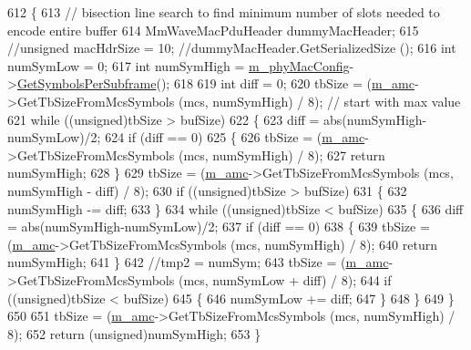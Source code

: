 \begin{DoxyCode}
612 \{
613         \textcolor{comment}{// bisection line search to find minimum number of slots needed to encode entire buffer}
614         MmWaveMacPduHeader dummyMacHeader;
615         \textcolor{comment}{//unsigned macHdrSize = 10; //dummyMacHeader.GetSerializedSize ();}
616         \textcolor{keywordtype}{int} numSymLow = 0;
617         \textcolor{keywordtype}{int} numSymHigh = \hyperlink{classns3_1_1MmWaveMacScheduler_a24d7af4971d2e500fe543cefbafa2fd9}{m\_phyMacConfig}->\hyperlink{classns3_1_1MmWavePhyMacCommon_a2fe835b76e3c689defa413e395cd10cb}{GetSymbolsPerSubframe}();
618 
619         \textcolor{keywordtype}{int} diff = 0;
620         tbSize = (\hyperlink{classns3_1_1MmWaveFlexTtiMacScheduler_a80d0b9fd279dd5c33c52cf0833d264da}{m\_amc}->GetTbSizeFromMcsSymbols (mcs, numSymHigh) / 8); \textcolor{comment}{// start with max value}
621         \textcolor{keywordflow}{while} ((\textcolor{keywordtype}{unsigned})tbSize > bufSize)
622         \{
623                 diff = abs(numSymHigh-numSymLow)/2;
624                 \textcolor{keywordflow}{if} (diff == 0)
625                 \{
626                         tbSize = (\hyperlink{classns3_1_1MmWaveFlexTtiMacScheduler_a80d0b9fd279dd5c33c52cf0833d264da}{m\_amc}->GetTbSizeFromMcsSymbols (mcs, numSymHigh) / 8);
627                         \textcolor{keywordflow}{return} numSymHigh;
628                 \}
629                 tbSize = (\hyperlink{classns3_1_1MmWaveFlexTtiMacScheduler_a80d0b9fd279dd5c33c52cf0833d264da}{m\_amc}->GetTbSizeFromMcsSymbols (mcs, numSymHigh - diff) / 8);
630                 \textcolor{keywordflow}{if} ((\textcolor{keywordtype}{unsigned})tbSize > bufSize)
631                 \{
632                         numSymHigh -= diff;
633                 \}
634                 \textcolor{keywordflow}{while} ((\textcolor{keywordtype}{unsigned})tbSize < bufSize)
635                 \{
636                         diff = abs(numSymHigh-numSymLow)/2;
637                         \textcolor{keywordflow}{if} (diff == 0)
638                         \{
639                                 tbSize = (\hyperlink{classns3_1_1MmWaveFlexTtiMacScheduler_a80d0b9fd279dd5c33c52cf0833d264da}{m\_amc}->GetTbSizeFromMcsSymbols (mcs, numSymHigh) / 8);
640                                 \textcolor{keywordflow}{return} numSymHigh;
641                         \}
642                         \textcolor{comment}{//tmp2 = numSym;}
643                         tbSize = (\hyperlink{classns3_1_1MmWaveFlexTtiMacScheduler_a80d0b9fd279dd5c33c52cf0833d264da}{m\_amc}->GetTbSizeFromMcsSymbols (mcs, numSymLow + diff) / 8);
644                         \textcolor{keywordflow}{if} ((\textcolor{keywordtype}{unsigned})tbSize < bufSize)
645                         \{
646                                 numSymLow += diff;
647                         \}
648                 \}
649         \}
650 
651         tbSize = (\hyperlink{classns3_1_1MmWaveFlexTtiMacScheduler_a80d0b9fd279dd5c33c52cf0833d264da}{m\_amc}->GetTbSizeFromMcsSymbols (mcs, numSymHigh) / 8);
652         \textcolor{keywordflow}{return} (\textcolor{keywordtype}{unsigned})numSymHigh;
653 \}
\end{DoxyCode}


